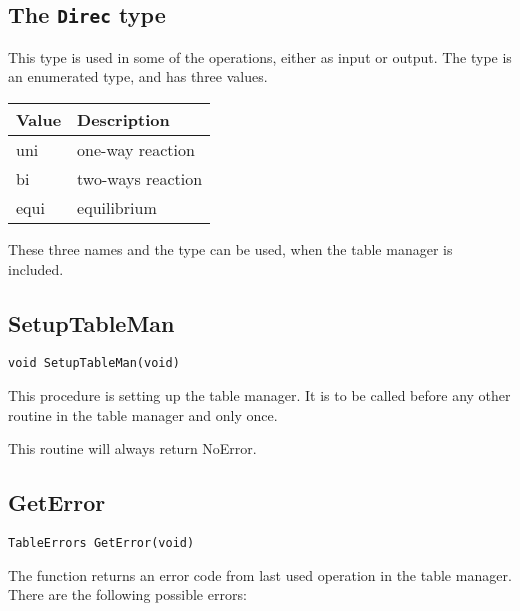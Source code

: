 \subsection{The {\tt Direc} type}
\label{direc}
This type is used in some of the operations, either as input or
output. The type is an enumerated type, and has three values. 

\vspace{0.2cm}
\begin{center}
\begin{tabular}{ll}
\hline
 Value  & Description      \\ \hline 
 uni    & one-way reaction \\ 
 bi     & two-ways reaction \\ 
 equi   & equilibrium       \\ 
\hline
\end{tabular}
\end{center}
\vspace{.2cm}

These three names and the type can be used, when the table manager is included.

\subsection{SetupTableMan}
\begin{verbatim}
void SetupTableMan(void)
\end{verbatim}
This procedure is setting up the table manager. It is to be called
before any other routine in the table manager and only once.

This routine will always return NoError.

\subsection{GetError}
\begin{verbatim}
TableErrors GetError(void)
\end{verbatim}
The function returns an error code from last used operation in the 
table manager. There are the following possible errors:


